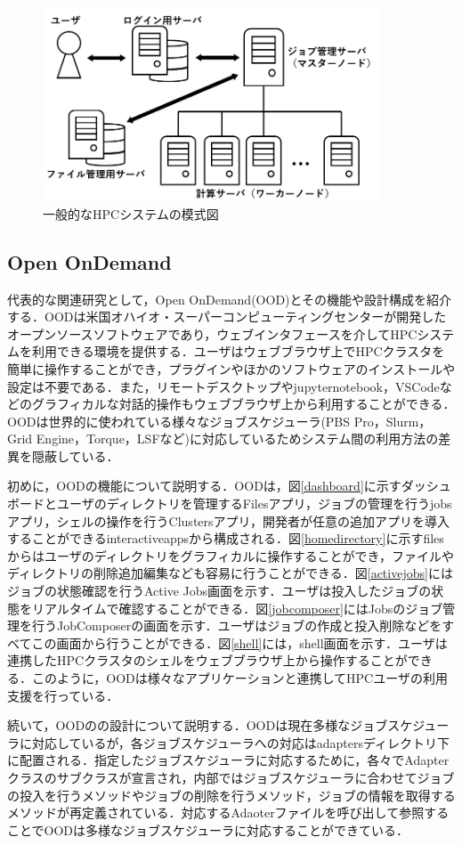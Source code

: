 \begin{figure}[tb]
    \centering
    \includegraphics[width=100mm]{./fig/HPCsystem.png}
    \caption{一般的なHPCシステムの模式図}
    \label{fig4}
\end{figure}

\subsection{Open OnDemand}
代表的な関連研究として，Open OnDemand(OOD)とその機能や設計構成を紹介する\cite{cite2}\cite{cite3}．OODは米国オハイオ・スーパーコンピューティングセンターが開発したオープンソースソフトウェアであり，ウェブインタフェースを介してHPCシステムを利用できる環境を提供する．ユーザはウェブブラウザ上でHPCクラスタを簡単に操作することができ，プラグインやほかのソフトウェアのインストールや設定は不要である．また，リモートデスクトップやjupyternotebook，VSCodeなどのグラフィカルな対話的操作もウェブブラウザ上から利用することができる．OODは世界的に使われている様々なジョブスケジューラ(PBS Pro，Slurm，Grid Engine，Torque，LSFなど)に対応しているためシステム間の利用方法の差異を隠蔽している．\par
初めに，OODの機能について説明する．OODは，図\ref{dashboard}に示すダッシュボードとユーザのディレクトリを管理するFilesアプリ，ジョブの管理を行うjobsアプリ，シェルの操作を行うClustersアプリ，開発者が任意の追加アプリを導入することができるinteractiveappsから構成される．図\ref{homedirectory}に示すfilesからはユーザのディレクトリをグラフィカルに操作することができ，ファイルやディレクトリの削除追加編集なども容易に行うことができる．図\ref{activejobs}にはジョブの状態確認を行うActive Jobs画面を示す．ユーザは投入したジョブの状態をリアルタイムで確認することができる．図\ref{jobcomposer}にはJobsのジョブ管理を行うJobComposerの画面を示す．ユーザはジョブの作成と投入削除などをすべてこの画面から行うことができる．図\ref{shell}には，shell画面を示す．ユーザは連携したHPCクラスタのシェルをウェブブラウザ上から操作することができる．このように，OODは様々なアプリケーションと連携してHPCユーザの利用支援を行っている．\par
続いて，OODのの設計について説明する．OODは現在多様なジョブスケジューラに対応しているが，各ジョブスケジューラへの対応はadaptersディレクトリ下に配置される．指定したジョブスケジューラに対応するために，各々でAdapterクラスのサブクラスが宣言され，内部ではジョブスケジューラに合わせてジョブの投入を行うメソッドやジョブの削除を行うメソッド，ジョブの情報を取得するメソッドが再定義されている．対応するAdaoterファイルを呼び出して参照することでOODは多様なジョブスケジューラに対応することができている．\par

